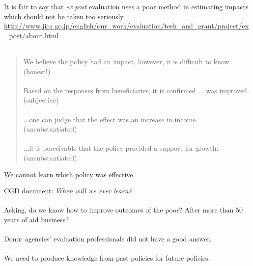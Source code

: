 \begin{frame}{}
\setlength{\parskip}{.7cm}
It is fair to say that \textit{ex post} evaluation uses a poor method in estimating impacts which should not be taken too seriously.\\
\hfill{\tiny\url{http://www.jica.go.jp/english/our_work/evaluation/tech_and_grant/project/ex_post/about.html}}\\~\\

\begin{quotation}
\setlength{\parskip}{.1cm}\setlength{\parsep}{.1cm}
We believe the policy had an impact, however, it is difficult to know. \hfill \textnormal{(honest!)}\\~\\
Based on the responses from beneficiaries, it is confirmed ... was improved. \hfill \textnormal{(subjective)}\\~\\
...one can judge that the effect was an increase in income. \hfill \textnormal{(unsubstantiated)}\\~\\
...it is perceivable that the policy provided a support for growth. \hfill \textnormal{(unsubstantiated)}\\
\end{quotation}

\vspace{-1ex}
\pause We cannot learn which policy was effective.
\end{frame}

\begin{frame}{}
\setlength{\parskip}{1cm}
\pause CGD document: \textit{When will we ever learn?} \citep{CGD2006}\\~\\

\pause Asking, do we know how to improve outcomes of the poor? After more than 50 years of aid business?\\~\\

\pause Donor agencies' evaluation professionals did not have a good answer.\\~\\

\pause We need to produce knowledge from past policies for future policies.\\~\\
\end{frame}


